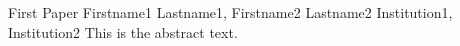 \begin{conf-abstract}
{First Paper}
{Firstname1 Lastname1, Firstname2 Lastname2}
{Institution1, Institution2}
This is the abstract text.
\end{conf-abstract}
